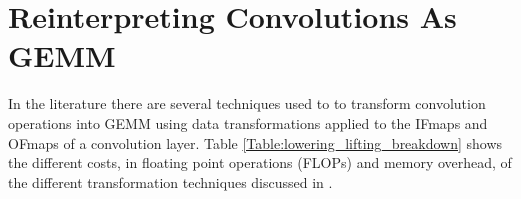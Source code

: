 
\clearpage
    
\section{Reinterpreting Convolutions As GEMM}

In the literature
\cite{cafe_con_troll} there
are several techniques used to to transform convolution operations into GEMM
using data transformations applied to the IFmaps and OFmaps of a convolution layer.
Table \ref{Table:lowering_lifting_breakdown} shows the different costs, in
floating point operations (FLOPs) and memory overhead, of the different
transformation techniques discussed in \cite{cafe_con_troll}. 

